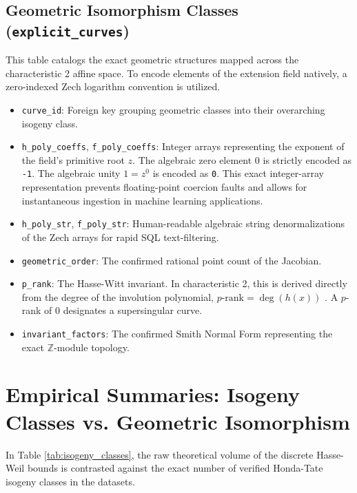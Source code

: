 \documentclass[11pt,letterpaper]{article}
\begin{document}
\subsection{Geometric Isomorphism Classes (\texttt{explicit\_curves})}
This table catalogs the exact geometric structures mapped across the characteristic 2 affine space. To encode elements of the extension field natively, a zero-indexed Zech logarithm convention is utilized.
\begin{itemize}
\item \texttt{curve\_id}: Foreign key grouping geometric classes into their overarching isogeny class.
\item \texttt{h\_poly\_coeffs}, \texttt{f\_poly\_coeffs}: Integer arrays representing the exponent of the field's primitive root $z$. The algebraic zero element $0$ is strictly encoded as \texttt{-1}. The algebraic unity $1 = z^0$ is encoded as \texttt{0}. This exact integer-array representation prevents floating-point coercion faults and allows for instantaneous ingestion in machine learning applications.
\item \texttt{h\_poly\_str}, \texttt{f\_poly\_str}: Human-readable algebraic string denormalizations of the Zech arrays for rapid SQL text-filtering.
\item \texttt{geometric\_order}: The confirmed rational point count of the Jacobian.
\item \texttt{p\_rank}: The Hasse-Witt invariant. In characteristic 2, this is derived directly from the degree of the involution polynomial, $p\text{-rank} = \deg(h(x))$ \cite{Scholten2002, Manin1963}. A $p$-rank of 0 designates a supersingular curve.
\item \texttt{invariant\_factors}: The confirmed Smith Normal Form representing the exact $\mathbb{Z}$-module topology.
\end{itemize}

\section{Empirical Summaries: Isogeny Classes vs. Geometric Isomorphism}
In Table \ref{tab:isogeny_classes}, the raw theoretical volume of the discrete Hasse-Weil bounds is contrasted against the exact number of verified Honda-Tate isogeny classes in the datasets.
\end{document}
